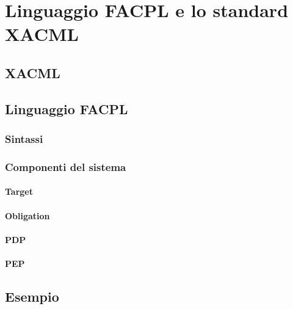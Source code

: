 \chapter{Linguaggio FACPL e lo standard XACML}
\label{chap:Linguaggio FACPL e lo standard XACML}

\section{XACML}
\label{sec:XACML}
\section{Linguaggio FACPL}
\label{sec:Linguaggio FACPL}
\subsection{Sintassi}
\label{sub:Sintassi}
\subsection{Componenti del sistema}
\label{sub:Componenti del sistema}
\subsubsection{Target}
\label{subs:Target}
\subsubsection{Obligation}
\label{subs:Obligation}

\subsubsection{PDP}
\label{subs:PDP}
\subsubsection{PEP}
\label{subs:PEP}

\section{Esempio}
\label{sec:Esempio}
